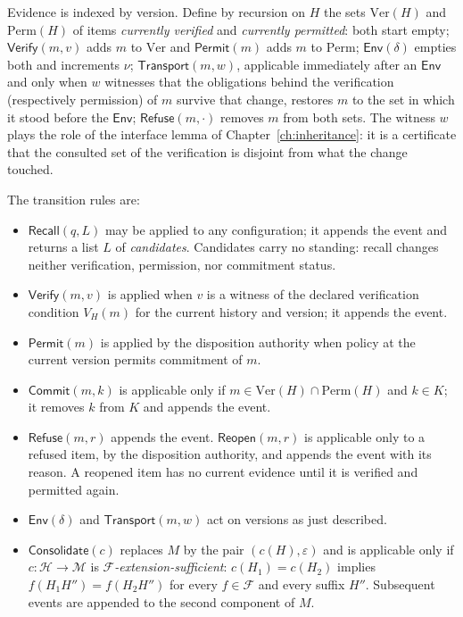 Evidence is indexed by version. Define by recursion on $H$ the sets $\mathrm{Ver}(H)$ and $\mathrm{Perm}(H)$ of items \emph{currently verified} and \emph{currently permitted}: both start empty; $\mathsf{Verify}(m,v)$ adds $m$ to $\mathrm{Ver}$ and $\mathsf{Permit}(m)$ adds $m$ to $\mathrm{Perm}$; $\mathsf{Env}(\delta)$ empties both and increments $\nu$; $\mathsf{Transport}(m,w)$, applicable immediately after an $\mathsf{Env}$ and only when $w$ witnesses that the obligations behind the verification (respectively permission) of $m$ survive that change, restores $m$ to the set in which it stood before the $\mathsf{Env}$; $\mathsf{Refuse}(m,\cdot)$ removes $m$ from both sets. The witness $w$ plays the role of the interface lemma of Chapter~\ref{ch:inheritance}: it is a certificate that the consulted set of the verification is disjoint from what the change touched.

The transition rules are:
\begin{itemize}[nosep]
\item $\mathsf{Recall}(q,L)$ may be applied to any configuration; it appends the event and returns a list $L$ of \emph{candidates}. Candidates carry no standing: recall changes neither verification, permission, nor commitment status.
\item $\mathsf{Verify}(m,v)$ is applied when $v$ is a witness of the declared verification condition $V_H(m)$ for the current history and version; it appends the event.
\item $\mathsf{Permit}(m)$ is applied by the disposition authority when policy at the current version permits commitment of $m$.
\item $\mathsf{Commit}(m,k)$ is applicable only if $m\in\mathrm{Ver}(H)\cap\mathrm{Perm}(H)$ and $k\in K$; it removes $k$ from $K$ and appends the event.
\item $\mathsf{Refuse}(m,r)$ appends the event. $\mathsf{Reopen}(m,r)$ is applicable only to a refused item, by the disposition authority, and appends the event with its reason. A reopened item has no current evidence until it is verified and permitted again.
\item $\mathsf{Env}(\delta)$ and $\mathsf{Transport}(m,w)$ act on versions as just described.
\item $\mathsf{Consolidate}(c)$ replaces $M$ by the pair $(c(H),\varepsilon)$ and is applicable only if $c:\mathcal H\to\mathcal M$ is \emph{$\mathcal F$-extension-sufficient}: $c(H_1)=c(H_2)$ implies $f(H_1H'')=f(H_2H'')$ for every $f\in\mathcal F$ and every suffix $H''$. Subsequent events are appended to the second component of $M$.
\end{itemize}

